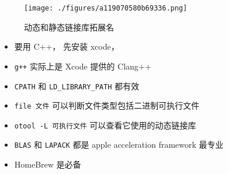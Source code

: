 
\begin{issues}
\issueDraft
\end{issues}

\begin{figure}[ht]
\centering
\texttt{[image: ./figures/a119070580b69336.png]}
\caption{动态和静态链接库拓展名} \label{fig_MacDev_1}
\end{figure}

\begin{itemize}
\item 要用 C++， 先安装 xcode， \item \verb`g++` 实际上是 Xcode 提供的 Clang++
\item \verb`CPATH` 和 \verb`LD_LIBRARY_PATH` 都有效
\item \verb`file 文件` 可以判断文件类型包括二进制可执行文件
\item \verb`otool -L 可执行文件` 可以查看它使用的动态链接库
\item \verb`BLAS` 和 \verb`LAPACK` 都是 apple acceleration framework 最专业
\item HomeBrew 是必备
\end{itemize}

